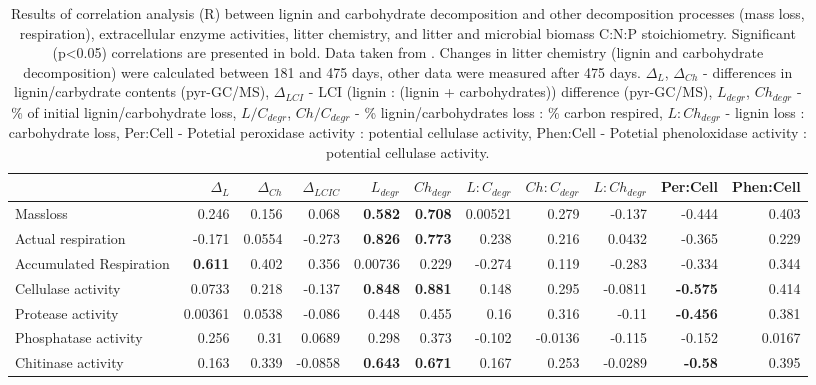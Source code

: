 \documentclass[10pt]{article}
\begin{document}
\begin{flushleft}
\begin{landscape}
\newpage
\begin{table}[h!]
\centering
\caption{Results of correlation analysis (R) between lignin and carbohydrate decomposition and other decomposition processes (mass loss, respiration), extracellular enzyme activities, litter chemistry, and litter and microbial biomass C:N:P stoichiometry. Significant (p\textless 0.05) correlations are presented in bold. Data taken from \cite{Mooshammer2011, Leitner2011}. Changes in litter chemistry (lignin and carbohydrate decomposition) were calculated between 181 and 475 days, other data were measured after 475 days. $\Delta _{L}$, $\Delta _{Ch}$ - differences in lignin/carbydrate contents (pyr-GC/MS), $\Delta _{LCI}$ - LCI (lignin : (lignin + carbohydrates)) difference (pyr-GC/MS), $L_{degr}$, $Ch_{degr}$ - \% of initial lignin/carbohydrate loss, $L/C_{degr}$, $Ch/C_{degr}$  - \% lignin/carbohydrates loss : \% carbon respired, $L:Ch_{degr}$ - lignin loss : carbohydrate loss, Per:Cell - Potetial peroxidase activity : potential cellulase activity, Phen:Cell - Potetial phenoloxidase activity : potential cellulase activity.} 
\label{corrtable2}
{\small
\begin{tabular}{lrrrrrrrrrr}
  \hline
 & $\Delta _{L}$ & $\Delta _{Ch}$ & $\Delta _{LCIC}$ & $L_{degr}$ & $Ch_{degr}$ & $L:C_{degr}$ & $Ch:C_{degr}$ & $L:Ch_{degr}$ & Per:Cell & Phen:Cell \\ 
  \hline
Massloss & 0.246 & 0.156 & 0.068 & \textbf{ 0.582 } & \textbf{ 0.708 } & 0.00521 & 0.279 & -0.137 & -0.444 & 0.403 \\ 
  Actual respiration & -0.171 & 0.0554 & -0.273 & \textbf{ 0.826 } & \textbf{ 0.773 } & 0.238 & 0.216 & 0.0432 & -0.365 & 0.229 \\ 
  Accumulated Respiration & \textbf{ 0.611 } & 0.402 & 0.356 & 0.00736 & 0.229 & -0.274 & 0.119 & -0.283 & -0.334 & 0.344 \\ 
  Cellulase activity & 0.0733 & 0.218 & -0.137 & \textbf{ 0.848 } & \textbf{ 0.881 } & 0.148 & 0.295 & -0.0811 & \textbf{ -0.575 } & 0.414 \\ 
  Protease activity & 0.00361 & 0.0538 & -0.086 & 0.448 & 0.455 & 0.16 & 0.316 & -0.11 & \textbf{ -0.456 } & 0.381 \\ 
  Phosphatase activity & 0.256 & 0.31 & 0.0689 & 0.298 & 0.373 & -0.102 & -0.0136 & -0.115 & -0.152 & 0.0167 \\ 
  Chitinase activity & 0.163 & 0.339 & -0.0858 & \textbf{ 0.643 } & \textbf{ 0.671 } & 0.167 & 0.253 & -0.0289 & \textbf{ -0.58 } & 0.395 \\ 

\end{tabular}}
\end{table}
\end{landscape}
\end{flushleft}
\end{document}
